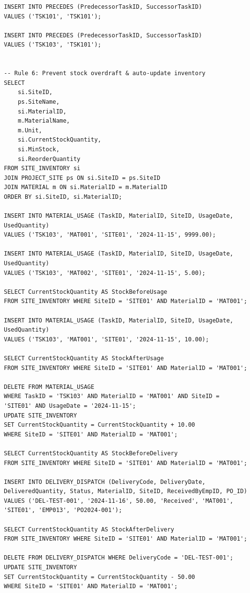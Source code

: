 \documentclass[a4paper,12pt]{report}
\begin{document}
\begin{lstlisting}
INSERT INTO PRECEDES (PredecessorTaskID, SuccessorTaskID)
VALUES ('TSK101', 'TSK101');

INSERT INTO PRECEDES (PredecessorTaskID, SuccessorTaskID)
VALUES ('TSK103', 'TSK101');


-- Rule 6: Prevent stock overdraft & auto-update inventory
SELECT 
    si.SiteID,
    ps.SiteName,
    si.MaterialID,
    m.MaterialName,
    m.Unit,
    si.CurrentStockQuantity,
    si.MinStock,
    si.ReorderQuantity
FROM SITE_INVENTORY si
JOIN PROJECT_SITE ps ON si.SiteID = ps.SiteID
JOIN MATERIAL m ON si.MaterialID = m.MaterialID
ORDER BY si.SiteID, si.MaterialID;

INSERT INTO MATERIAL_USAGE (TaskID, MaterialID, SiteID, UsageDate, UsedQuantity)
VALUES ('TSK103', 'MAT001', 'SITE01', '2024-11-15', 9999.00);

INSERT INTO MATERIAL_USAGE (TaskID, MaterialID, SiteID, UsageDate, UsedQuantity)
VALUES ('TSK103', 'MAT002', 'SITE01', '2024-11-15', 5.00);

SELECT CurrentStockQuantity AS StockBeforeUsage
FROM SITE_INVENTORY WHERE SiteID = 'SITE01' AND MaterialID = 'MAT001';

INSERT INTO MATERIAL_USAGE (TaskID, MaterialID, SiteID, UsageDate, UsedQuantity)
VALUES ('TSK103', 'MAT001', 'SITE01', '2024-11-15', 10.00);

SELECT CurrentStockQuantity AS StockAfterUsage
FROM SITE_INVENTORY WHERE SiteID = 'SITE01' AND MaterialID = 'MAT001';

DELETE FROM MATERIAL_USAGE
WHERE TaskID = 'TSK103' AND MaterialID = 'MAT001' AND SiteID = 'SITE01' AND UsageDate = '2024-11-15';
UPDATE SITE_INVENTORY
SET CurrentStockQuantity = CurrentStockQuantity + 10.00
WHERE SiteID = 'SITE01' AND MaterialID = 'MAT001';

SELECT CurrentStockQuantity AS StockBeforeDelivery
FROM SITE_INVENTORY WHERE SiteID = 'SITE01' AND MaterialID = 'MAT001';

INSERT INTO DELIVERY_DISPATCH (DeliveryCode, DeliveryDate, DeliveredQuantity, Status, MaterialID, SiteID, ReceivedByEmpID, PO_ID)
VALUES ('DEL-TEST-001', '2024-11-16', 50.00, 'Received', 'MAT001', 'SITE01', 'EMP013', 'PO2024-001');

SELECT CurrentStockQuantity AS StockAfterDelivery
FROM SITE_INVENTORY WHERE SiteID = 'SITE01' AND MaterialID = 'MAT001';

DELETE FROM DELIVERY_DISPATCH WHERE DeliveryCode = 'DEL-TEST-001';
UPDATE SITE_INVENTORY
SET CurrentStockQuantity = CurrentStockQuantity - 50.00
WHERE SiteID = 'SITE01' AND MaterialID = 'MAT001';



\end{lstlisting}
\end{document}

